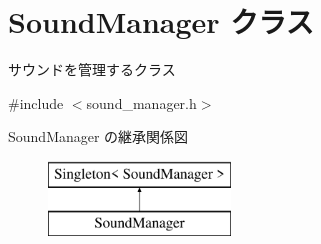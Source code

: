 \hypertarget{class_sound_manager}{}\section{Sound\+Manager クラス}
\label{class_sound_manager}


サウンドを管理するクラス  




{\ttfamily \#include $<$sound\+\_\+manager.\+h$>$}

Sound\+Manager の継承関係図\begin{figure}[H]
\begin{center}
\leavevmode
\includegraphics[height=2.000000cm]{class_sound_manager}
\end{center}
\end{figure}
